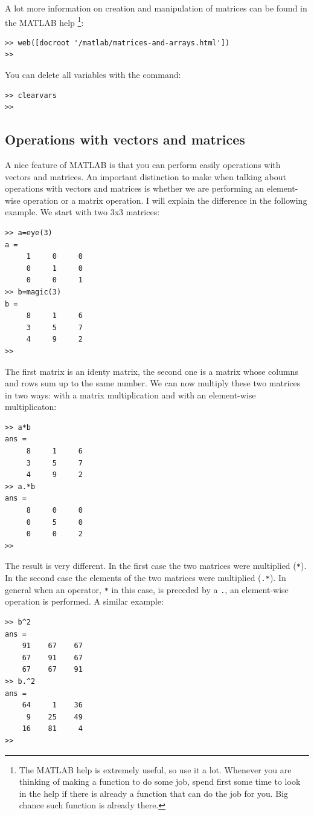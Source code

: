 \documentclass[a4paper]{article}
\begin{document}
A lot more information on creation and manipulation of matrices can be found in the MATLAB help \footnote{The MATLAB help is extremely useful, so use it a lot. Whenever you are thinking of making a function to do some job, spend first some time to look in the help if there is already a function that can do the job for you. Big chance such function is already there.}:
\begin{lstlisting}
>> web([docroot '/matlab/matrices-and-arrays.html'])
>>
\end{lstlisting}

You can delete all variables with the command:
\begin{lstlisting}
>> clearvars
>>
\end{lstlisting}

\subsection{Operations with vectors and matrices}
A nice feature of MATLAB is that you can perform easily operations with vectors and matrices. An important distinction to make when talking about operations with vectors and matrices is whether we are performing an element-wise operation or a matrix operation. I will explain the difference in the following example. We start with two 3x3 matrices:
\begin{lstlisting}
>> a=eye(3)
a =
     1     0     0
     0     1     0
     0     0     1
>> b=magic(3)
b =
     8     1     6
     3     5     7
     4     9     2
>> 
\end{lstlisting}
The first matrix is an identy matrix, the second one is a matrix whose columns and rows sum up to the same number.
We can now multiply these two matrices in two ways: with a matrix multiplication and with an element-wise multiplicaton:
\begin{lstlisting}
>> a*b
ans =
     8     1     6
     3     5     7
     4     9     2
>> a.*b
ans =
     8     0     0
     0     5     0
     0     0     2
>> 
\end{lstlisting}
The result is very different. In the first case the two matrices were multiplied (\lstinline=*=). In the second case the elements of the two matrices were multiplied (\lstinline=.*=). In general when an operator, \lstinline=*= in this case, is preceded by a \lstinline=.=, an element-wise operation is performed. A similar example:
\begin{lstlisting}
>> b^2
ans =
    91    67    67
    67    91    67
    67    67    91
>> b.^2
ans =
    64     1    36
     9    25    49
    16    81     4
>>
\end{lstlisting}
\end{document}
